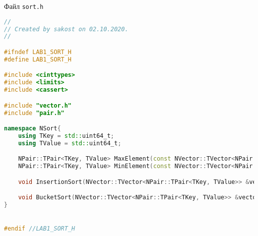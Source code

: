 Файл \texttt{sort.h}
\begin{lstlisting}[language=C++]
	//
// Created by sakost on 02.10.2020.
//

#ifndef LAB1_SORT_H
#define LAB1_SORT_H

#include <cinttypes>
#include <limits>
#include <cassert>

#include "vector.h"
#include "pair.h"

namespace NSort{
    using TKey = std::uint64_t;
    using TValue = std::uint64_t;

    NPair::TPair<TKey, TValue> MaxElement(const NVector::TVector<NPair::TPair<TKey, TValue>> &vector);
    NPair::TPair<TKey, TValue> MinElement(const NVector::TVector<NPair::TPair<TKey, TValue>> &vector);

    void InsertionSort(NVector::TVector<NPair::TPair<TKey, TValue>> &vector);

    void BucketSort(NVector::TVector<NPair::TPair<TKey, TValue>> &vector);
}


#endif //LAB1_SORT_H
\end{lstlisting}

